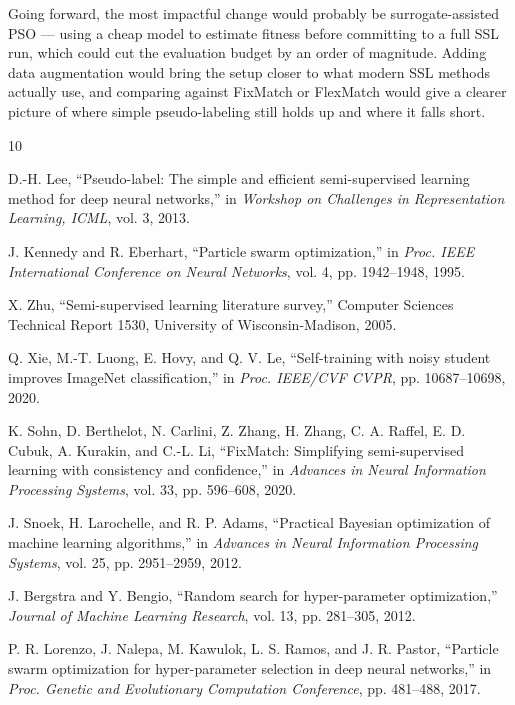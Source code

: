 \documentclass[journal]{IEEEtran}
\begin{document}
Going forward, the most impactful change would probably be surrogate-assisted
PSO --- using a cheap model to estimate fitness before committing to a full
SSL run, which could cut the evaluation budget by an order of magnitude.
Adding data augmentation would bring the setup closer to what modern SSL
methods actually use, and comparing against FixMatch \cite{sohn2020fixmatch}
or FlexMatch would give a clearer picture of where simple pseudo-labeling
still holds up and where it falls short.

\begin{thebibliography}{10}

D.-H. Lee,
``Pseudo-label: The simple and efficient semi-supervised learning method
for deep neural networks,''
in \textit{Workshop on Challenges in Representation Learning, ICML},
vol. 3, 2013.

J. Kennedy and R. Eberhart,
``Particle swarm optimization,''
in \textit{Proc. IEEE International Conference on Neural Networks},
vol. 4, pp. 1942--1948, 1995.

X. Zhu,
``Semi-supervised learning literature survey,''
Computer Sciences Technical Report 1530, University of Wisconsin-Madison,
2005.

Q. Xie, M.-T. Luong, E. Hovy, and Q. V. Le,
``Self-training with noisy student improves ImageNet classification,''
in \textit{Proc. IEEE/CVF CVPR}, pp. 10687--10698, 2020.

K. Sohn, D. Berthelot, N. Carlini, Z. Zhang, H. Zhang, C. A. Raffel,
E. D. Cubuk, A. Kurakin, and C.-L. Li,
``FixMatch: Simplifying semi-supervised learning with consistency and
confidence,''
in \textit{Advances in Neural Information Processing Systems},
vol. 33, pp. 596--608, 2020.

J. Snoek, H. Larochelle, and R. P. Adams,
``Practical Bayesian optimization of machine learning algorithms,''
in \textit{Advances in Neural Information Processing Systems},
vol. 25, pp. 2951--2959, 2012.

J. Bergstra and Y. Bengio,
``Random search for hyper-parameter optimization,''
\textit{Journal of Machine Learning Research}, vol. 13, pp. 281--305, 2012.

P. R. Lorenzo, J. Nalepa, M. Kawulok, L. S. Ramos, and J. R. Pastor,
``Particle swarm optimization for hyper-parameter selection in deep neural
networks,''
in \textit{Proc. Genetic and Evolutionary Computation Conference},
pp. 481--488, 2017.


\end{thebibliography}
\end{document}
